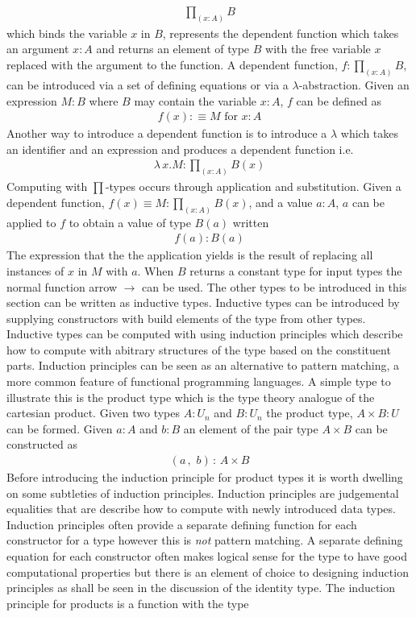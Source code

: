 \begin{align*}
    \prod_{(x : A)}B
\end{align*}
which binds the variable $x$ in $B$, represents the dependent function which takes
an argument $x : A$ and returns an element of type $B$ with the free variable
$x$ replaced with the argument to the function. A dependent function, $f :
\prod_{(x : A)}B$, can be introduced via a set of defining equations or via a
$\lambda$-abstraction. Given an expression $M : B$ where $B$ may contain the
variable $x : A$, $f$ can be defined as
\begin{align*}
    f (x) :\equiv M \textrm{ for } x : A
\end{align*}
Another way to introduce a dependent function is to introduce a $\lambda$ which
takes an identifier and an expression and produces a dependent function i.e.
\begin{align*}
    \lambda \, x . M : \prod_{(x : A)}B(x)
\end{align*}
Computing with $\prod$-types occurs through application and substitution. Given
a dependent function, $f(x) \equiv M : \prod_{(x : A)}B(x)$, and a value $a : A$, $a$ can be
applied to $f$ to obtain a value of type $B(a)$ written
\begin{align*}
    f(a) : B(a)
\end{align*}
The expression that the the application yields is the result of replacing all
instances of $x$ in $M$ with $a$. When $B$ returns a constant type for input
types the normal function arrow $\rightarrow$ can be used.  The other types to
be introduced in this section can be written as inductive types. Inductive types
can be introduced by supplying constructors with build elements of the type from
other types. Inductive types can be computed with using induction principles
which describe how to compute with abitrary structures of the type based on the
constituent parts. Induction principles can be seen as an alternative to pattern
matching, a more common feature of functional programming languages. A simple
type to illustrate this is the product type which is the type theory analogue of
the cartesian product. Given two types $A : U_{n}$ and $B : U_{n}$ the product
type, $A \times B : U$ can be formed. Given $a : A$ and $b : B$ an element of
the pair type $A \times B$ can be constructed as
\begin{align*}
    (a \, , \, \, b) \, : \, A \times B
\end{align*}
Before introducing the induction principle for product types it is worth
dwelling on some subtleties of induction principles. Induction principles are
judgemental equalities that are describe how to compute with newly introduced
data types. Induction principles often provide a separate defining function for
each constructor for a type however this is \textit{not} pattern matching. A
separate defining equation for each constructor often makes logical sense for
the type to have good computational properties but there is an element of choice
to designing induction principles as shall be seen in the discussion of the
identity type. The induction principle for products is a function with the type

